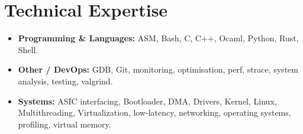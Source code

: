 \documentclass[9pt,a4paper]{article}
\begin{document}
\section*{Technical Expertise}
\begin{tcolorbox}[mybox]
\begin{itemize}
\item \textbf{Programming \& Languages:} ASM, Bash, C, C++, Ocaml, Python, Rust, Shell.

\item \textbf{Other / DevOps:} GDB, Git, monitoring, optimisation, perf, strace, system analysis, testing, valgrind.

\item \textbf{Systems:} ASIC interfacing, Bootloader, DMA, Drivers, Kernel, Linux, Multithreading, Virtualization, low-latency, networking, operating systems, profiling, virtual memory.
\end{itemize}
\end{tcolorbox}
\end{document}
